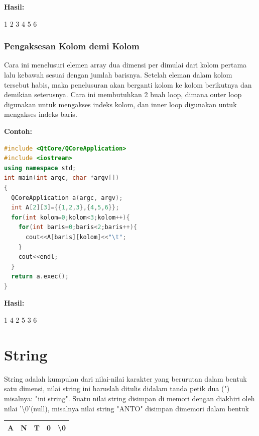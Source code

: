 \textbf{Hasil:}

\begin{lcverbatim}
1	 2 	3
4 	5 	6
\end{lcverbatim}

\subsubsection{Pengaksesan Kolom demi Kolom}\label{pengaksesan-kolom-demi-kolom}

Cara ini menelusuri elemen array dua dimensi per dimulai dari kolom
pertama lalu kebawah sesuai dengan jumlah barisnya. Setelah eleman dalam
kolom tersebut habis, maka penelusuran akan berganti kolom ke kolom
berikutnya dan demikian seterusnya. Cara ini membutuhkan 2 buah loop,
dimana outer loop digunakan untuk mengakses indeks kolom, dan inner loop
digunakan untuk mengakses indeks baris.

\textbf{Contoh:}

\begin{lstlisting}[language=c++, caption=Pengaksesan Kolom demi Kolom, label=contoh3-13]
#include <QtCore/QCoreApplication>
#include <iostream>
using namespace std;
int main(int argc, char *argv[])
{
  QCoreApplication a(argc, argv);
  int A[2][3]={{1,2,3},{4,5,6}};
  for(int kolom=0;kolom<3;kolom++){
    for(int baris=0;baris<2;baris++){
      cout<<A[baris][kolom]<<"\t";
    }
    cout<<endl;
  }
  return a.exec();
}
\end{lstlisting}

\textbf{Hasil:}

\begin{lcverbatim}
1	 4
2	 5
3 	6
\end{lcverbatim}

\section{String}\label{string}

String adalah kumpulan dari nilai-nilai karakter yang berurutan dalam
bentuk satu dimensi, nilai string ini haruslah ditulis didalam tanda
petik dua (") misalnya: "ini string". Suatu nilai string disimpan di
memori dengan diakhiri oleh nilai '\textbackslash0'(null), misalnya nilai string
"ANTO" disimpan dimemori dalam bentuk

\begin{tabular}{|c|c|c|c|c|}
	\hline
	A & N & T & 0 & \textbackslash{0}\\ \hline
\end{tabular}


